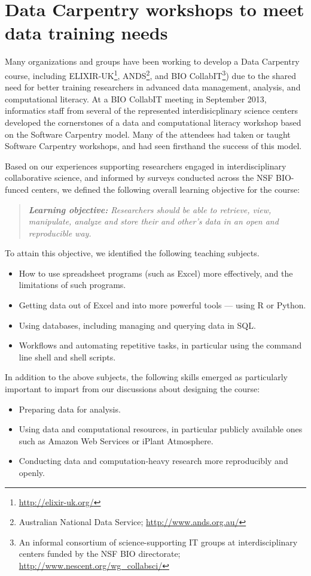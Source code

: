 \documentclass[11pt]{article}
\begin{document}
\section{Data Carpentry workshops to meet data training needs} \label{sec:dc-workshops}

Many organizations and groups have been working to develop a Data
Carpentry course, including
ELIXIR-UK\footnote{\url{http://elixir-uk.org/}},
ANDS\footnote{Australian National Data Service;
  \url{http://www.ands.org.au/}}, and BIO CollabIT\footnote{An
  informal consortium of science-supporting IT groups at
  interdisciplinary centers funded by the NSF BIO directorate;
  \url{http://www.nescent.org/wg_collabsci/}}) due to the shared need
for better training researchers in advanced data management, analysis,
and computational literacy. At a BIO CollabIT meeting in September
2013, informatics staff from several of the represented
interdisicplinary science centers developed the cornerstones of a data
and computational literacy workshop based on the Software Carpentry
model. Many of the attendees had taken or taught Software Carpentry
workshops, and had seen firsthand the success of this model.

Based on our experiences supporting researchers engaged in
interdisciplinary collaborative science, and informed by surveys
conducted across the NSF BIO-funced centers, we defined the following
overall learning objective for the course:
\begin{quote}{\emph{\textbf{Learning objective:} Researchers should be
      able to retrieve, view, manipulate, analyze and store their and
      other's data in an open and reproducible way.}}
\end{quote}

To attain this objective, we identified the following teaching subjects.
\begin{itemize}
\item How to use spreadsheet programs (such as Excel) more effectively, and the limitations of such programs.
\item Getting data out of Excel and into more powerful tools --- using R or Python.
\item Using databases, including managing and querying data in SQL.
\item Workflows and automating repetitive tasks, in particular using the command line shell and shell scripts.
\end{itemize}

In addition to the above subjects, the following skills emerged as
particularly important to impart from our discussions about designing
the course:
\begin{itemize}
\item Preparing data for analysis.
\item Using data and computational resources, in particular publicly available ones such as Amazon Web Services or iPlant Atmosphere.
\item Conducting data and computation-heavy research more reproducibly and openly.
\end{itemize}
\end{document}
